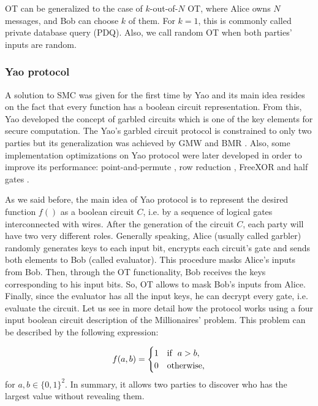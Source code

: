 OT can be generalized to the case of $k$-out-of-$N$ OT, where Alice owns $N$ messages, and Bob can choose $k$ of them. For $k=1$, this is commonly called private database query (PDQ). Also, we call random OT when both parties' inputs are random.


\subsubsection{Yao protocol}\label{yaoProtocol}

A solution to SMC was given for the first time by Yao \cite{Yao82} and its main idea resides on the fact that every function has a boolean circuit representation. From this, Yao developed the concept of garbled circuits which is one of the key elements for secure computation. The Yao's garbled circuit protocol is constrained to only two parties but its generalization was achieved by GMW \cite{Goldreich87} and BMR \cite{BMR90}. Also, some implementation optimizations on Yao protocol were later developed in order to improve its performance: point-and-permute \cite{BMR90}, row reduction \cite{NPS99, Pinkas2009}, FreeXOR \cite{Kolesnikov2005} and half gates \cite{Zahur2015}. 

As we said before, the main idea of Yao protocol is to represent the desired function $f()$ as a boolean circuit $C$, i.e. by a sequence of logical gates interconnected with wires. After the generation of the circuit $C$, each party will have two very different roles. Generally speaking, Alice (usually called garbler) randomly generates keys to each input bit, encrypts each circuit's gate and sends both elements to Bob (called evaluator). This procedure masks Alice's inputs from Bob. Then, through the OT functionality, Bob receives the keys corresponding to his input bits. So, OT allows to mask Bob's inputs from Alice. Finally, since the evaluator has all the input keys, he can decrypt every gate, i.e. evaluate the circuit. Let us see in more detail how the protocol works using a four input boolean circuit description of the Millionaires' problem. This problem can be described by the following expression:

\begin{equation}
f(a, b) = 
     \begin{cases} 
      1 & \mathrm{if} \hspace{0.2cm} a>b, \\
      0 & \mathrm{otherwise},
   \end{cases}
\label{eq:MPeq}
\end{equation}   
for $a, b \in \{0,1\}^2$. In summary, it allows two parties to discover who has the largest value without revealing them.

